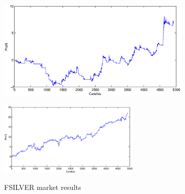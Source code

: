 \documentclass{tewiart}
\begin{document}
\begin{figure}[h]
\begin{minipage}{.49\linewidth}
\centering 
\includegraphics[width=0.82\textwidth]{images/S1d_silver.eps}
\label{mansard}
\end{minipage}
\begin{minipage}{\linewidth}
\centering 
\includegraphics[width=0.6\textwidth]{images/S1s_silver.eps}
\label{mansard}
\end{minipage}
\caption{FSILVER market results}
\end{figure}
\FloatBarrier




\end{document}
